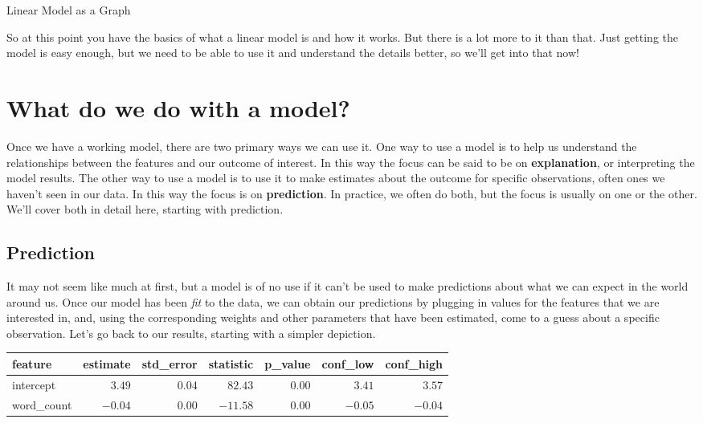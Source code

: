 \documentclass[
  letterpaper,
]{krantz}
\begin{document}
Linear Model as a Graph

So at this point you have the basics of what a linear model is and how
it works. But there is a lot more to it than that. Just getting the
model is easy enough, but we need to be able to use it and understand
the details better, so we'll get into that now!

\section{What do we do with a model?}\label{what-do-we-do-with-a-model}

Once we have a working model, there are two primary ways we can use it.
One way to use a model is to help us understand the relationships
between the features and our outcome of interest. In this way the focus
can be said to be on \textbf{explanation}, or interpreting the model
results. The other way to use a model is to use it to make estimates
about the outcome for specific observations, often ones we haven't seen
in our data. In this way the focus is on \textbf{prediction}. In
practice, we often do both, but the focus is usually on one or the
other. We'll cover both in detail here, starting with prediction.

\subsection{Prediction}\label{prediction}

It may not seem like much at first, but a model is of no use if it can't
be used to make predictions about what we can expect in the world around
us. Once our model has been \emph{fit} to the data, we can obtain our
predictions by plugging in values for the features that we are
interested in, and, using the corresponding weights and other parameters
that have been estimated, come to a guess about a specific observation.
Let's go back to our results, starting with a simpler depiction.

\begin{longtable*}{lrrrrrr}
\toprule
feature & estimate & std\_error & statistic & p\_value & conf\_low & conf\_high \\ 
\midrule\addlinespace[2.5pt]
intercept & \textcolor[HTML]{404040}{$3.49$} & \textcolor[HTML]{404040}{$0.04$} & \textcolor[HTML]{404040}{$82.43$} & \textcolor[HTML]{404040}{$0.00$} & \textcolor[HTML]{404040}{$3.41$} & \textcolor[HTML]{404040}{$3.57$} \\ 
word\_count & \textcolor[HTML]{404040}{$-0.04$} & \textcolor[HTML]{404040}{$0.00$} & \textcolor[HTML]{404040}{$-11.58$} & \textcolor[HTML]{404040}{$0.00$} & \textcolor[HTML]{404040}{$-0.05$} & \textcolor[HTML]{404040}{$-0.04$} \\ 
\bottomrule
\end{longtable*}
\end{document}
